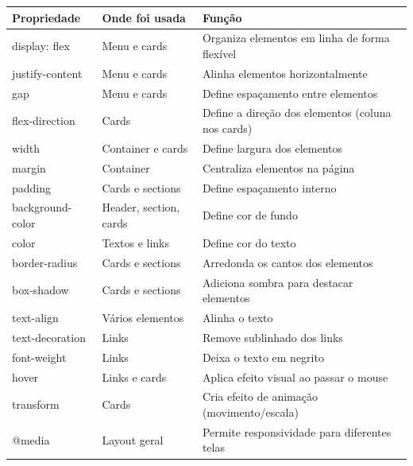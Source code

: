\documentclass[12pt,a4paper]{article}
\begin{document}
    \begin{boxTabela}
    \begin{tabular}{|p{4cm}|p{5cm}|p{7cm}|}
    \hline
    \rowcolor{pretoTabela}
    \color{white}\textbf{Propriedade} &
    \color{white}\textbf{Onde foi usada} &
    \color{white}\textbf{Função} \\
    \hline
    
    display: flex & Menu e cards & Organiza elementos em linha de forma flexível \\
    \hline
    
    justify-content & Menu e cards & Alinha elementos horizontalmente \\
    \hline
    
    gap & Menu e cards & Define espaçamento entre elementos \\
    \hline
    
    flex-direction & Cards & Define a direção dos elementos (coluna nos cards) \\
    \hline
    
    width & Container e cards & Define largura dos elementos \\
    \hline
    
    margin & Container & Centraliza elementos na página \\
    \hline
    
    padding & Cards e sections & Define espaçamento interno \\
    \hline
    
    background-color & Header, section, cards & Define cor de fundo \\
    \hline
    
    color & Textos e links & Define cor do texto \\
    \hline
    
    border-radius & Cards e sections & Arredonda os cantos dos elementos \\
    \hline
    
    box-shadow & Cards e sections & Adiciona sombra para destacar elementos \\
    \hline
    
    text-align & Vários elementos & Alinha o texto \\
    \hline
    
    text-decoration & Links & Remove sublinhado dos links \\
    \hline
    
    font-weight & Links & Deixa o texto em negrito \\
    \hline
    
    hover & Links e cards & Aplica efeito visual ao passar o mouse \\
    \hline
    
    transform & Cards & Cria efeito de animação (movimento/escala) \\
    \hline
    
    @media & Layout geral & Permite responsividade para diferentes telas \\
    \hline

\end{tabular}
\end{boxTabela}
\end{document}
